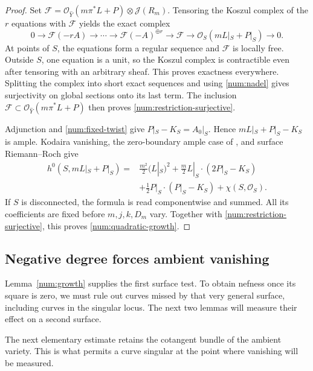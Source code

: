 \begin{proof}
Set \(\mathcal F=
\mathcal O_{\widehat Y}(m\pi^*L+P)\otimes\mathcal J(R_m)\).
Tensoring the Koszul complex of the \(r\) equations with
\(\mathcal F\) yields the exact complex
\[
0\longrightarrow\mathcal F(-rA)
\longrightarrow\cdots\longrightarrow
\mathcal F(-A)^{\oplus r}\longrightarrow\mathcal F
\longrightarrow\mathcal O_S(mL|_S+P|_S)
\longrightarrow 0.
\]
At points of \(S\), the equations form a regular
sequence and \(\mathcal F\) is locally free.  Outside \(S\), one
equation is a unit, so the Koszul complex is contractible even after
tensoring with an arbitrary sheaf.  This proves exactness everywhere.
Splitting the complex into short exact sequences and using
\eqref{num:nadel} gives surjectivity on global sections onto its last
term.  The inclusion
\(\mathcal F\subset\mathcal O_{\widehat Y}(m\pi^*L+P)\)
then proves \eqref{num:restriction-surjective}.

Adjunction and \eqref{num:fixed-twist} give
\(P|_S-K_S=A_0|_S\).  Hence \(mL|_S+P|_S-K_S\) is ample.
Kodaira vanishing, the zero-boundary ample case of
\cite[Theorem~2.4]{LazMI}, and surface Riemann--Roch
\cite[Chapter~V, Section~1]{Hartshorne77} give
\[
\begin{split}
h^0(S,mL|_S+P|_S)
={}&\frac{m^2}{2}(L|_S)^2
+\frac m2 L|_S\cdot(2P|_S-K_S)\\
&+\frac12 P|_S\cdot(P|_S-K_S)
+\chi(S,\mathcal O_S).
\end{split}
\]
If \(S\) is disconnected, the formula is read componentwise and
summed.  All its coefficients are fixed before \(m,j,k,D_m\) vary.
Together with \eqref{num:restriction-surjective}, this proves
\eqref{num:quadratic-growth}.
\end{proof}

\subsection{Negative degree forces ambient vanishing}

Lemma~\ref{num:growth} supplies the first surface test. To obtain
nefness once its square is zero, we must rule out curves missed by that
very general surface, including curves in the singular locus. The next
two lemmas will measure their effect on a second surface.

The next elementary estimate retains the cotangent bundle of the
ambient variety.  This is what permits a curve singular at the
point where vanishing will be measured.

